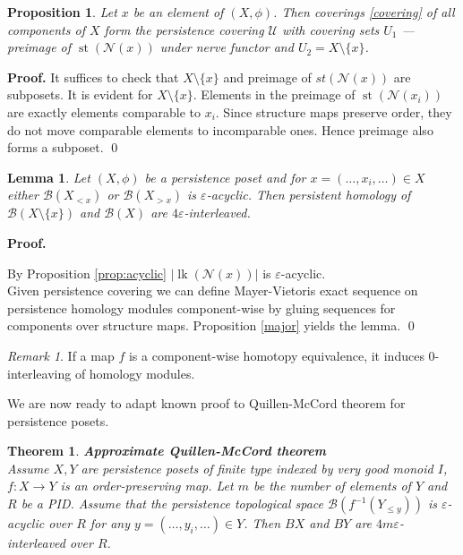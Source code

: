 \documentclass[english,12pt]{article}
\newcounter{stmcounter}[section]
\newcounter{thcounter}
\numberwithin{equation}{section}
\newtheorem{proposition}[stmcounter]{Proposition}
\newtheorem{lemma}[stmcounter]{Lemma}
\newtheorem{theorem}[thcounter]{Theorem}
\theoremstyle{definition}
\theoremstyle{remark}
\newtheorem{remark}[stmcounter]{Remark}
\newenvironment{pf}{\noindent\textbf{Proof.}}{\qed}
\begin{document}
\begin{proposition}
  Let $x$ be an element of $(X,\phi)$. Then coverings \eqref{covering} of all components of $X$ form the persistence covering $\mathcal{U}$ with covering sets $U_1$ --- preimage of $\operatorname{st}(\mathcal{N}(x))$ under nerve functor and $U_2 = X \setminus \{x\}$.
\end{proposition}

\begin{pf}
  It suffices to check that $X \setminus \{x\}$ and preimage of $st(\mathcal{N}(x))$ are subposets.
  It is evident for $X \setminus \{x\}$. Elements in the preimage of $\operatorname{st}(\mathcal{N}(x_i))$ are exactly elements comparable to $x_i$. Since structure maps preserve order, they do not move comparable elements to incomparable ones. Hence preimage also forms a subposet.
\end{pf}\\

\begin{lemma}
  Let $(X,\phi)$ be a persistence poset and for $x=(\ldots,x_i,\ldots) \in X$ either $\mathcal{B}(X_{< x})$ or $\mathcal{B}(X_{> x})$ is $\varepsilon$-acyclic. Then persistent homology of $\mathcal{B}(X \setminus \{x\})$ and $\mathcal{B}(X)$ are $4\varepsilon$-interleaved.
\end{lemma}

\begin{pf} ~ \par
  By Proposition \ref{prop:acyclic} $\left|\operatorname{lk}(\mathcal{N}(x))\right|$ is $\varepsilon$-acyclic.\\

  Given persistence covering we can define Mayer-Vietoris exact sequence on persistence homology modules component-wise by gluing sequences for components over structure maps. Proposition \ref{major} yields the lemma.
\end{pf}

\begin{remark}
  If a map $f$ is a component-wise homotopy equivalence, it induces $0$-interleaving of homology modules.
\end{remark}

We are now ready to adapt known proof to Quillen-McCord theorem for persistence posets.

\begin{theorem} \textbf{Approximate Quillen-McCord theorem}\\
  Assume $X, Y$ are persistence posets of finite type indexed by very good monoid $I$, $f : X \to Y$ is an order-preserving map. Let $m$ be the number of elements of $Y$ and $R$ be a PID. Assume that the persistence topological space $\mathcal{B}(f^{-1}(Y_{\leqslant y}))$ is $\varepsilon$-acyclic over $R$ for any $y=(\ldots,y_i,\ldots) \in Y$. Then $BX$ and $BY$ are $4m\varepsilon$-interleaved over $R$.\\
\end{theorem}
\end{document}
